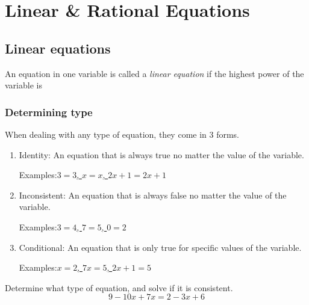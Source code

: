 \renewcommand{\thesection}{\arabic{section}}
\setcounter{section}{0}

\section{Linear \& Rational Equations}

\subsection{Linear equations}

\begin{definition}\label{def: linear equation}
An equation in one variable is called a \emph{linear equation} if the
highest power of the variable is 
\end{definition}

\subsubsection{Determining type}

When dealing with any type of equation, they come in 3 forms.
\begin{enumerate}[1)]
\item Identity: An equation that is always true no matter the value of the variable.

\quad Examples:\underline{\phantom{=}\ifprintanswers$3=3$, $x=x$, $2x+1=2x+1$\else\phantom{=================}\fi\phantom{=}}

\item Inconsistent: An equation that is always false no matter the value of the variable.

\quad Examples:\underline{\phantom{=}\ifprintanswers$3=4$, $7=5$, $0=2$\else\phantom{=================}\fi\phantom{=}}

\item Conditional: An equation that is only true for specific values of the variable.

\quad Examples:\underline{\phantom{=}\ifprintanswers$x=2$, $7x=5$, $2x+1=5$\else\phantom{=================}\fi\phantom{=}}
\end{enumerate}

\begin{exercise}
Determine what type of equation, and solve if it is consistent.
\[
9-10x+7x=2-3x+6
\]
\end{exercise}
\begin{solution}[1.5in]

\end{solution}
\vspace{0.5em}


